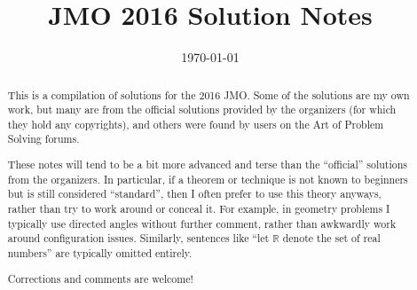 \documentclass[11pt]{scrartcl}
\title{JMO 2016 Solution Notes}
\date{\today}
\begin{document}
\maketitle

\begin{abstract}
This is a compilation of solutions
for the 2016 JMO.
Some of the solutions are my own work,
but many are from the official solutions provided by the organizers
(for which they hold any copyrights),
and others were found by users on the Art of Problem Solving forums.

These notes will tend to be a bit more advanced and terse than the ``official''
solutions from the organizers.
In particular, if a theorem or technique is not known to beginners
but is still considered ``standard'', then I often prefer to
use this theory anyways, rather than try to work around or conceal it.
For example, in geometry problems I typically use directed angles
without further comment, rather than awkwardly work around configuration issues.
Similarly, sentences like ``let $\mathbb{R}$ denote the set of real numbers''
are typically omitted entirely.

Corrections and comments are welcome!
\end{abstract}

\tableofcontents
\newpage

\addtocounter{section}{-1}
\end{document}

